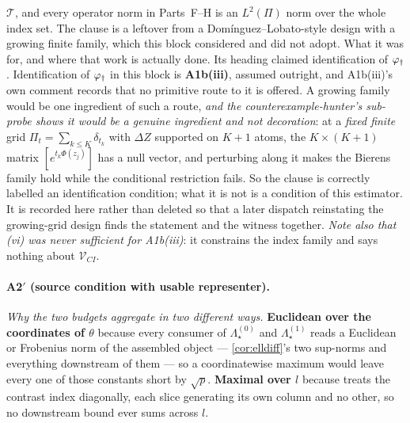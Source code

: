 \begin{enumerate}
$\mathcal T$, and every operator norm in Parts~F--H is an $L^{2}(\Pi)$ norm over the whole index set. The
clause is a leftover from a Dom\'inguez--Lobato-style design with a growing finite family, which this block
considered and did not adopt.
What it was for, and where that work is actually done. Its heading claimed identification of
$\varphi_{\dagger}$. Identification of $\varphi_{\dagger}$ in this block is \textbf{A1b(iii)}, assumed outright, and A1b(iii)'s
own comment records that no primitive route to it is offered. A growing family would be one ingredient of
such a route, \emph{and the counterexample-hunter's sub-probe shows it would be a genuine ingredient and
not decoration}: at a \emph{fixed finite} grid $\Pi_t=\sum_{k\le K}\delta_{t_k}$ with $\Delta Z$ supported on
$K+1$ atoms, the $K\times(K+1)$ matrix $[e^{t_k\Phi(z_j)}]$ has a null vector, and perturbing along it makes
the Bierens family hold while the conditional restriction fails. So the clause is correctly labelled an
identification condition; what it is not is a condition of this estimator. It is recorded here rather than
deleted so that a later dispatch reinstating the growing-grid design finds the statement and the witness
together. \emph{Note also that (vi) was never sufficient for A1b(iii)}: it constrains the index family and
says nothing about $\mathcal V_{CI}$.
\end{enumerate}

\paragraph{A2$'$ (source condition with usable representer).}

\emph{Why the two budgets aggregate in two different ways.} \textbf{Euclidean over the coordinates of
$\theta$} because every consumer of $\Lambda^{(0)}_\star$ and $\Lambda^{(1)}_\star$ reads a Euclidean or
Frobenius norm of the assembled object --- \cref{cor:elldiff}'s two sup-norms and everything downstream
of them --- so a coordinatewise maximum would leave every one of those constants short by $\sqrt p$.
\textbf{Maximal over $l$} because  treats the contrast index diagonally, each slice
generating its own column and no other, so no downstream bound ever sums across $l$.

